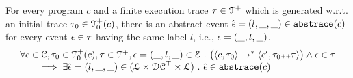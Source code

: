 \begin{lemma}
    For every program $c$ and
    a finite execution trace $\mathtt{\tau} \in \mathcal{T}^{+}$ which is generated w.r.t.
    an initial trace  $\mathtt{\tau}_0 \in \mathcal{T}^{+}_0(c)$,
    there is an abstract event $\hat{\mathtt{\epsilon}{}} = (l, \_, \_) \in \mathtt{abs}{\mathtt{trace}}(c)$ 
    for every event $\mathtt{\epsilon} \in \mathtt{\tau}$ having the same label $l$, i.e., $\mathtt{\epsilon} = (\_, l, \_)$.
    \[
    \begin{array}{l}
      \forall c \in \mathcal{C}, \mathtt{\tau}_0 \in \mathcal{T}^{+}_0(c), \mathtt{\tau} \in \mathcal{T}^{+} ,  \mathtt{\epsilon} = (\_, l, \_) \in \mathcal{E} ~.~
      \big(
        \langle {c}, \mathtt{\tau}_0 \rangle \to^{*} \langle c', \mathtt{\tau}_0 {\scriptscriptstyle ++} \mathtt{\tau} \rangle 
      \big)
      \land \mathtt{\epsilon} \in \mathtt{\tau} 
      \\
      \qquad \implies \exists \hat{\mathtt{\epsilon}{}} = (l, \_, \_) \in (\mathcal{L}\times \mathcal{DC}^{\top} \times \mathcal{L}) ~.~ 
      \hat{\mathtt{\epsilon}{}} \in \mathtt{abs}{\mathtt{trace}}(c)
    \end{array}
    \]
  \end{lemma}
